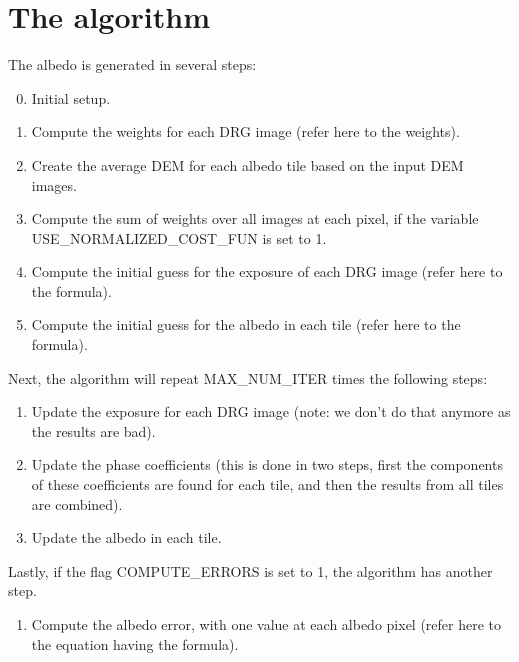 \documentclass{article}
\begin{document}
\section{The algorithm}

The albedo is generated in several steps:

\begin{enumerate}
\setcounter{enumi}{-1}
\item Initial setup. %
\item Compute the weights for each DRG image (refer here to the weights).
\item Create the average DEM for each albedo tile based on the input DEM
  images.
\item Compute the sum of weights over all images at each pixel, if the
  variable \\ 
USE\_NORMALIZED\_COST\_FUN is set to 1. 
\item Compute the initial guess for the exposure of each DRG image
  (refer here to the formula).
\item Compute the initial guess for the albedo in each tile (refer here
  to the formula).
\setcounter{saveenum}{\value{enumi}}
\end{enumerate}

\noindent 
Next, the algorithm will repeat MAX\_NUM\_ITER times the following steps:

\begin{enumerate}
\setcounter{enumi}{\value{saveenum}}
\item Update the exposure for each DRG image (note: we don't do that anymore as the results are bad).
\item Update the phase coefficients (this is done in two steps, first the components of these coefficients are found for each tile, and then the results from all tiles are combined).
\item Update the albedo in each tile.
\setcounter{saveenum}{\value{enumi}}
\end{enumerate}

\noindent Lastly,  if the flag COMPUTE\_ERRORS is set to 1, the algorithm has
another step.

\begin{enumerate}
\setcounter{enumi}{\value{saveenum}}
\item Compute the albedo error, with one value at each
albedo pixel (refer here to the equation having the formula). 
\end{enumerate}
\end{document}
